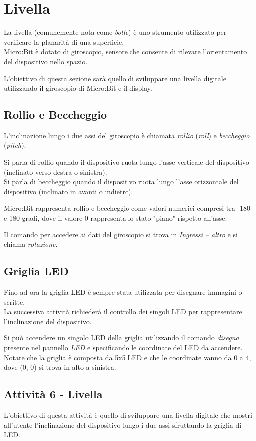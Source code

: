 \documentclass[../../docenti.tex]{subfiles}
\begin{document}
\section{Livella}
La livella (comunemente nota come \textit{bolla}) è uno strumento utilizzato per verificare la planarità di una superficie.\\
Micro:Bit è dotato di giroscopio, sensore che consente di rilevare l'orientamento del dispositivo nello spazio.

L'obiettivo di questa sezione sarà quello di sviluppare una livella digitale utilizzando il giroscopio di Micro:Bit e il display.

\subsection{Rollio e Beccheggio}
L'inclinazione lungo i due assi del giroscopio è chiamata \textit{rollio} (\textit{roll}) e \textit{beccheggio} (\textit{pitch}).

Si parla di rollio quando il dispositivo ruota lungo l'asse verticale del dispositivo (inclinato verso destra o sinistra).\\
Si parla di beccheggio quando il dispositivo ruota lungo l'asse orizzontale del dispositivo (inclinato in avanti o indietro).

Micro:Bit rappresenta rollio e beccheggio come valori numerici compresi tra -180 e 180 gradi, dove il valore 0 rappresenta lo stato "piano" rispetto all'asse.

Il comando per accedere ai dati del giroscopio si trova in \textit{Ingressi -- altro} e si chiama \textit{rotazione}.

\subsection{Griglia LED}
Fino ad ora la griglia LED è sempre stata utilizzata per disegnare immagini o scritte.\\
La successiva attività richiederà il controllo dei singoli LED per rappresentare l'inclinazione del dispositivo.

Si può accendere un singolo LED della griglia utilizzando il comando \textit{disegna} presente nel pannello \textit{LED} e specificando le coordinate del LED da accendere.\\
Notare che la griglia è composta da 5x5 LED e che le coordinate vanno da 0 a 4, dove (0, 0) si trova in alto a sinistra.
\newpage
\subsection{Attività 6 - Livella}
L'obiettivo di questa attività è quello di sviluppare una livella digitale che mostri all'utente l'inclinazione del dispositivo lungo i due assi sfruttando la griglia di LED.
\end{document}
